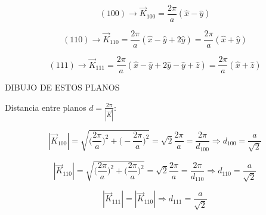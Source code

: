 \documentclass[a4paper]{article}
\begin{document}
\begin{itemize}
$$(100) \rightarrow \vec{K}_{100} = \frac{2 \pi}{a}(\hat{x} - \hat{y})$$

$$(110) \rightarrow \vec{K}_{110} = \frac{2 \pi}{a}(\hat{x} - \hat{y} + 2\hat{y}) = \frac{2 \pi}{a}(\hat{x} + \hat{y})$$

$$(111) \rightarrow \vec{K}_{111} = \frac{2 \pi}{a}(\hat{x} - \hat{y} + 2\hat{y} - \hat{y} + \hat{z}) = \frac{2 \pi}{a}(\hat{x} + \hat{z})$$

DIBUJO DE ESTOS PLANOS

Distancia entre planos $d = \frac{2\pi}{|\vec{K}|}$:

$$| \vec{K}_{100} | = \sqrt{\bigg(\frac{2 \pi}{a}\bigg)^{2} + \bigg(-\frac{2 \pi}{a}\bigg)^{2}} =  \sqrt{2} \frac{2\pi}{a} =  \frac{2\pi}{d_{100}} \Rightarrow d_{100} = \frac{a}{\sqrt{2}}$$

$$| \vec{K}_{110} | =  \sqrt{\bigg(\frac{2 \pi}{a}\bigg)^{2} + \bigg(\frac{2 \pi}{a}\bigg)^{2}} =  \sqrt{2} \frac{2\pi}{a} =  \frac{2\pi}{d_{110}} \Rightarrow d_{110} = \frac{a}{\sqrt{2}}$$

$$| \vec{K}_{111} | = | \vec{K}_{110} | \Rightarrow d_{111} = \frac{a}{\sqrt{2}}$$

\end{itemize}

\newpage
\begin{thebibliography}{99} %
 
\end{thebibliography}


\end{document}
